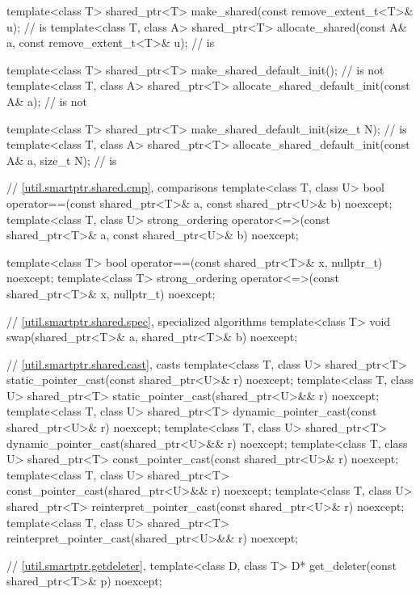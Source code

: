 \begin{codeblock}
{  template<class T>
    shared_ptr<T> make_shared(const remove_extent_t<T>& u);                     //  is 
  template<class T, class A>
    shared_ptr<T> allocate_shared(const A& a, const remove_extent_t<T>& u);     //  is 

  template<class T>
    shared_ptr<T> make_shared_default_init();                                   //  is not 
  template<class T, class A>
    shared_ptr<T> allocate_shared_default_init(const A& a);                     //  is not 

  template<class T>
    shared_ptr<T> make_shared_default_init(size_t N);                           //  is 
  template<class T, class A>
    shared_ptr<T> allocate_shared_default_init(const A& a, size_t N);           //  is 

  // \ref{util.smartptr.shared.cmp},  comparisons
  template<class T, class U>
    bool operator==(const shared_ptr<T>& a, const shared_ptr<U>& b) noexcept;
  template<class T, class U>
    strong_ordering operator<=>(const shared_ptr<T>& a, const shared_ptr<U>& b) noexcept;

  template<class T>
    bool operator==(const shared_ptr<T>& x, nullptr_t) noexcept;
  template<class T>
    strong_ordering operator<=>(const shared_ptr<T>& x, nullptr_t) noexcept;

  // \ref{util.smartptr.shared.spec},  specialized algorithms
  template<class T>
    void swap(shared_ptr<T>& a, shared_ptr<T>& b) noexcept;

  // \ref{util.smartptr.shared.cast},  casts
  template<class T, class U>
    shared_ptr<T> static_pointer_cast(const shared_ptr<U>& r) noexcept;
  template<class T, class U>
    shared_ptr<T> static_pointer_cast(shared_ptr<U>&& r) noexcept;
  template<class T, class U>
    shared_ptr<T> dynamic_pointer_cast(const shared_ptr<U>& r) noexcept;
  template<class T, class U>
    shared_ptr<T> dynamic_pointer_cast(shared_ptr<U>&& r) noexcept;
  template<class T, class U>
    shared_ptr<T> const_pointer_cast(const shared_ptr<U>& r) noexcept;
  template<class T, class U>
    shared_ptr<T> const_pointer_cast(shared_ptr<U>&& r) noexcept;
  template<class T, class U>
    shared_ptr<T> reinterpret_pointer_cast(const shared_ptr<U>& r) noexcept;
  template<class T, class U>
    shared_ptr<T> reinterpret_pointer_cast(shared_ptr<U>&& r) noexcept;

  // \ref{util.smartptr.getdeleter},  
  template<class D, class T>
    D* get_deleter(const shared_ptr<T>& p) noexcept;

}
\end{codeblock}
